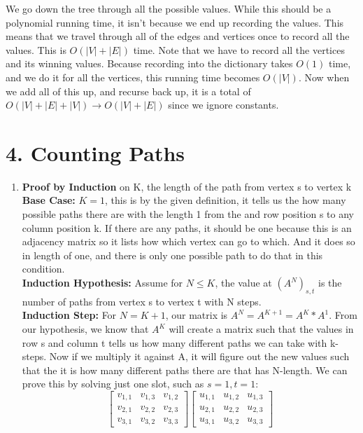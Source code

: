 \documentclass[11pt]{article}
\newenvironment{qparts}{\begin{enumerate}[{(}a{)}]}{\end{enumerate}}
\begin{document}
\begin{qparts}
We go down the tree through all the possible values. While this should be a polynomial running time, it isn't because we end up recording the values. This means that we travel through all of the edges and vertices once to record all the values. This is $O(|V| + |E|)$ time. Note that we have to record all the vertices and its winning values. Because recording into the dictionary takes $O(1)$ time, and we do it for all the vertices, this running time becomes $O(|V|)$. Now when we add all of this up, and recurse back up, it is a total of $O(|V|+|E|+|V|) \rightarrow O(|V|+|E|)$ since we ignore constants. 
\end{qparts}
\newpage
\section*{4. Counting Paths}
\begin{qparts}
\item \textbf{Proof by Induction} on K, the length of the path from vertex s to vertex k \\

\textbf{Base Case:} $K = 1$, this is by the given definition, it tells us the how many possible paths there are with the length 1 from the and row position s to any column position k. If there are any paths, it should be one because this is an adjacency matrix so it lists how which vertex can go to which. And it does so in length of one, and there is only one possible path to do that in this condition. \\
\textbf{Induction Hypothesis:} Assume for $N \leq K$, the value at $(A^N)_{s, t}$ is the number of paths from vertex s to vertex t with N steps. \\
\textbf{Induction Step:} For $N = K + 1$, our matrix is $A^N = A^{K+1} = A^K * A^1$. From our hypothesis, we know that $A^K$ will create a matrix such that the values in row s and column t tells us how many different paths we can take with k-steps. Now if we multiply it against A, it will figure out the new values such that the it is how many different paths there are that has N-length. We can prove this by solving just one slot, such as $s = 1, t = 1$:
\[
\begin{bmatrix}
    v_{1,1}       & v_{1,3} & v_{1,2} \\
    v_{2,1}       & v_{2,2} & v_{2,3} \\
    v_{3,1}       & v_{3,2} & v_{3,3}  
\end{bmatrix}
\begin{bmatrix}
    u_{1,1}       & u_{1,2} & u_{1,3} \\
    u_{2,1}       & u_{2,2} & u_{2,3} \\
    u_{3,1}       & u_{3,2} & u_{3,3}  
\end{bmatrix}
\]


\end{qparts}
\end{document}
